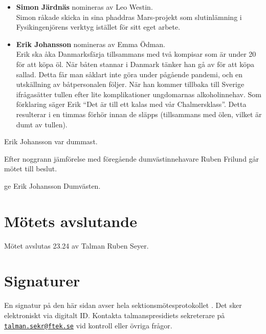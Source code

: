 \documentclass[hidelinks]{sektionsmote} %
\begin{document}
\begin{itemize}
  \item \textbf{Simon Järdnäs} nomineras av Leo Westin.\\
  Simon råkade skicka in sina phaddras Mars-projekt som slutinlämning i Fysikingenjörens verktyg istället för sitt eget arbete. 

  \item \textbf{Erik Johansson} nomineras av Emma Ödman.\\
  Erik ska åka Danmarksfärja tillsammans med två kompisar som är under 20 för att köpa öl.
  När båten stannar i Danmark tänker han gå av för att köpa sallad.
  Detta får man såklart inte göra under pågående pandemi, och en utskällning av båtpersonalen följer.
  När han kommer tillbaka till Sverige ifrågasätter tullen efter lite komplikationer ungdomarnas alkoholinnehav.
  Som förklaring säger Erik \enquote{Det är till ett kalas med vår Chalmersklass}.
  Detta resulterar i en timmas förhör innan de släpps (tillsammans med ölen, vilket är dumt av tullen).

\end{itemize}

\begin{beslut}
  \item Erik Johansson var dummast.
\end{beslut}
Efter noggrann jämförelse med föregående dumvästinnehavare Ruben Frilund går mötet till beslut.
\begin{beslut}
  \item ge Erik Johansson Dumvästen.
\end{beslut}

\section{Mötets avslutande}
Mötet avslutas 23.24 av Talman Ruben Seyer.

\clearpage
\section*{Signaturer}
\label{sec:sig}
En signatur på den här sidan avser hela sektionsmötesprotokollet \themote. Det sker elektroniskt via digitalt ID. Kontakta talmanspresidiets sekreterare på \href{mailto:talman.sekr@ftek.se}{\texttt{talman.sekr@ftek.se}} vid kontroll eller övriga frågor. 

\vspace{4cm}
\begin{center}
\end{center}
\end{document}
